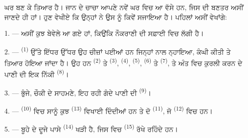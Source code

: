 %
%

\VUsaut{6.0mm}
\VUsaut{1.4mm}
\VUsaut{0.4mm}
\VUsaut{2.2mm}

ਘਰ ਬਣ ਕੇ ਤਿਆਰ ਹੈ। ਜਾਨ ਦੇ ਚਾਚਾ ਆਪਣੇ ਨਵੇਂ ਘਰ ਵਿਚ ਆ ਵੱਸੇ ਹਨ, ਜਿਸ ਦੀ ਬਣਤਰ ਅਸੀਂ
ਜਾਣਦੇ ਹੀ ਹਾਂ। ਹੁਣ ਵੇਖੀਏ ਕਿ ਉਨ੍ਹਾਂ ਨੇ ਉਸ ਨੂੰ ਕਿਵੇਂ ਸਜਾਇਆ ਹੈ। ਪਹਿਲਾਂ ਅਸੀਂ
ਵੇਖਾਂਗੇ:

\VUsaut{3.0mm}

1. --- ਅਸੀਂ ਕੁਝ ਬੇਵੇਲੇ ਆ ਗਏ ਹਾਂ, ਕਿਉਂਕਿ ਨੌਕਰਾਣੀ  ਦੀ ਸਫ਼ਾਈ ਵਿਚ
ਲੱਗੀ ਹੈ।

2. ---  \textsuperscript{(1)} ਉੱਤੇ ਇੱਧਰ ਉੱਧਰ ਉਹ
ਚੀਜ਼ਾਂ ਪਈਆਂ ਹਨ ਜਿਨ੍ਹਾਂ ਨਾਲ ਨ੍ਹਾਇਆ, ਕੰਘੀ ਕੀਤੀ ਤੇ ਤਿਆਰ ਹੋਇਆ ਜਾਂਦਾ ਹੈ। ਉਹ ਹਨ
 \textsuperscript{(2)} ਤੇ  \textsuperscript{(3)},
 \textsuperscript{(4)},  \textsuperscript{(5)},
 \textsuperscript{(6)} ਤੇ  \textsuperscript{(7)}, ਤੇ ਅੰਤ
ਵਿਚ ਕੁਰਲੀ ਕਰਨ ਦੇ ਪਾਣੀ ਦੀ ਇਕ ਨਿੱਕੀ  \textsuperscript{(8)}।

3. --- ਭੁੰਜੇ, ਚੌਕੀ ਦੇ ਸਾਹਮਣੇ, ਇਹ ਰਹੀ ਗੰਦੇ ਪਾਣੀ ਦੀ 
\textsuperscript{(9)}।

4. ---  \textsuperscript{(10)} ਵਿਚ ਸਾਨੂੰ ਕੁਝ
 \textsuperscript{(13)} ਵਿਖਾਈ ਦਿੰਦੀਆਂ ਹਨ ਤੇ ਦੋ
 \textsuperscript{(11)}, ਜੋ 
\textsuperscript{(12)} ਵਿਚ ਹਨ।

5. --- ਬੂਹੇ ਦੇ ਦੂਜੇ ਪਾਸੇ  \textsuperscript{(14)} ਖੜੀ
ਹੈ, ਜਿਸ ਵਿਚ  \textsuperscript{(15)} ਰੱਖੇ ਰਹਿੰਦੇ ਹਨ।

